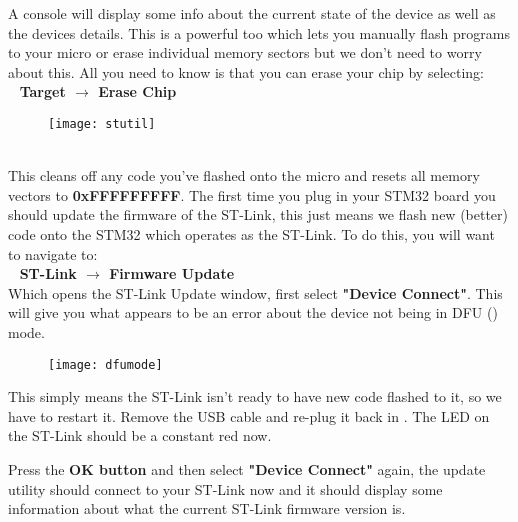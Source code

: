 \par
{}
\newpage
A console will display some info about the current state of the device as well as the devices details.  This is a powerful too which lets you manually flash programs to your micro  or erase individual memory sectors but we don’t need to worry about this. All you need to know is that you can erase your chip by selecting:\\
\-\ \hspace{20pt}\textbf{\color{Green} Target $\rightarrow$ Erase Chip}
\\
\begin{figure}[htbp]
\centering
\texttt{[image: stutil]}
\end{figure}
\\
This cleans off any code you've flashed onto the micro and resets all memory vectors to \textbf{0xFFFFFFFFF}.
The first \underline{} time you plug in your STM32 board you should update the firmware of the ST-Link, this just means we flash new (better) code onto the STM32 which operates as the ST-Link.
To do this, you will want to navigate to:\\
\-\ \hspace{20pt}\textbf{\color{Green} ST-Link $\rightarrow$ Firmware Update}
\\
Which opens the ST-Link Update window, first select \textbf{\color{Purple} "Device Connect"}. This will give you what appears to be an error about the device not being in DFU (\underline{}) mode.\\
\begin{figure}[hbtp]
\centering
\texttt{[image: dfumode]}
\end{figure}
\newpage
This simply means the ST-Link isn't ready to have new code flashed to it, so we have to restart it. Remove the USB cable and re-plug it back in {\color{red}\underline{}}. The LED on the ST-Link should be a constant red now.
\par
Press the \textbf{\color{Purple} OK button} and then select \textbf{\color{Purple} "Device Connect"} again, the update utility should connect to your ST-Link now and it should display some information about what the current ST-Link firmware version is.
